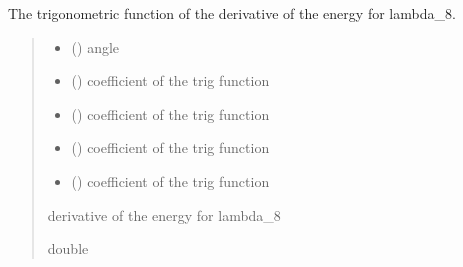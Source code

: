 \documentclass[letterpaper,10pt,english]{sphinxmanual}
\begin{document}
\begin{fulllineitems}
\label{\detokenize{numerical_reject:numerical_reject.derivee_f_lambda_8}}
\pysigstartsignatures
\pysiglinewithargsret
{}
{\sphinxparamcomma {}\sphinxparamcomma {}\sphinxparamcomma {}\sphinxparamcomma {}}
{}
\pysigstopsignatures
\sphinxAtStartPar
The trigonometric function of the derivative of the energy for lambda\_8.
\begin{quote}\begin{description}
\begin{itemize}
\item {} 
\sphinxAtStartPar
{} () \textendash{} angle

\item {} 
\sphinxAtStartPar
{} () \textendash{} coefficient of the trig function

\item {} 
\sphinxAtStartPar
{} () \textendash{} coefficient of the trig function

\item {} 
\sphinxAtStartPar
{} () \textendash{} coefficient of the trig function

\item {} 
\sphinxAtStartPar
{} () \textendash{} coefficient of the trig function

\end{itemize}

\sphinxAtStartPar
derivative of the energy for lambda\_8

\sphinxAtStartPar
double

\end{description}\end{quote}

\end{fulllineitems}
\end{document}
